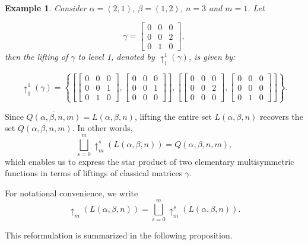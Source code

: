 \documentclass[11pt]{article}
\newtheorem{exa}[thm]{Example}
\begin{document}
\begin{exa}
    Consider $\alpha = (2, 1)$, $\beta = (1, 2)$, $n = 3$ and $m = 1$. Let

    $$\gamma = \begin{bmatrix}
        0 & 0 & 0\\
        0 & 0 & 2\\
        0 & 1 & 0
    \end{bmatrix},$$
    then the lifting of $\gamma$ to level 1, denoted by $\uparrow_{1}^{1}(\gamma)$, is given by:

    $$
    \uparrow_{1}^{1}(\gamma) = \left\{
    \left[
    \begin{bmatrix}
        0 & 0 & 0\\
        0 & 0 & 1\\
        0 & 1 & 0
    \end{bmatrix},
    \begin{bmatrix}
        0 & 0 & 0\\
        0 & 0 & 1\\
        0 & 0 & 0
    \end{bmatrix}
    \right],
    \left[
    \begin{bmatrix}
        0 & 0 & 0\\
        0 & 0 & 2\\
        0 & 0 & 0
    \end{bmatrix},
    \begin{bmatrix}
        0 & 0 & 0\\
        0 & 0 & 0\\
        0 & 1 & 0
    \end{bmatrix}
    \right]
    \right\}.
    $$
\end{exa}



Since $\overline{Q(\alpha,\beta,n,m)} = L(\alpha,\beta,n)$, lifting the entire set $L(\alpha,\beta,n)$ recovers the set $Q(\alpha,\beta,n,m)$. In other words,
$$
\displaystyle\bigsqcup_{s=0}^{m} \uparrow_{m}^{s}(L(\alpha,\beta,n)) = Q(\alpha,\beta,n,m),
$$
which enables us to express the star product of two elementary multisymmetric functions in terms of liftings of classical matrices $\gamma$.

For notational convenience, we write
$$
\uparrow_{m}(L(\alpha,\beta,n)) = \displaystyle\bigsqcup_{s=0}^{m} \uparrow_{m}^{s}(L(\alpha,\beta,n)).
$$

This reformulation is summarized in the following proposition.
\end{document}
